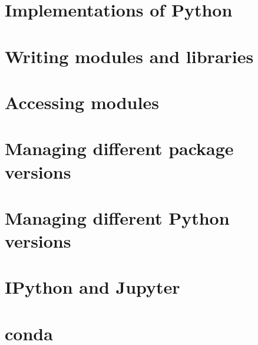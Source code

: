 \documentclass[oneside]{book}
\begin{document}
\part{Implementations of Python}


\part{Writing modules and libraries}



\part{Accessing modules}


\part{Managing different package versions}


\part{Managing different Python versions}


\part{IPython and Jupyter}


\part{conda}

\end{document}
